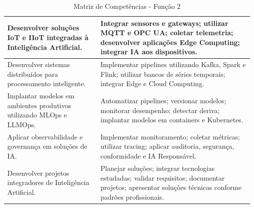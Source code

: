 \begin{table}[htb]
\begin{tabular}{|p{6cm}|p{10cm}|}
\hline
Desenvolver soluções IoT e IIoT integradas à Inteligência Artificial. & Integrar sensores e gateways; utilizar MQTT e OPC UA; coletar telemetria; desenvolver aplicações Edge Computing; integrar IA aos dispositivos. \\
\hline
Desenvolver sistemas distribuídos para processamento inteligente. & Implementar pipelines utilizando Kafka, Spark e Flink; utilizar bancos de séries temporais; integrar Edge e Cloud Computing. \\
\hline
Implantar modelos em ambientes produtivos utilizando MLOps e LLMOps. & Automatizar pipelines; versionar modelos; monitorar desempenho; detectar deriva; implantar modelos em containers e Kubernetes. \\
\hline
Aplicar observabilidade e governança em soluções de IA. & Implementar monitoramento; coletar métricas; utilizar tracing; aplicar auditoria, segurança, conformidade e IA Responsável. \\
\hline
Desenvolver projetos integradores de Inteligência Artificial. & Planejar soluções; integrar tecnologias estudadas; validar requisitos; documentar projetos; apresentar soluções técnicas conforme padrões profissionais. \\
\hline
\end{tabular}
\caption{Matriz de Competências - Função 2}
\label{tab:matriz_funcao2}
\end{table}
